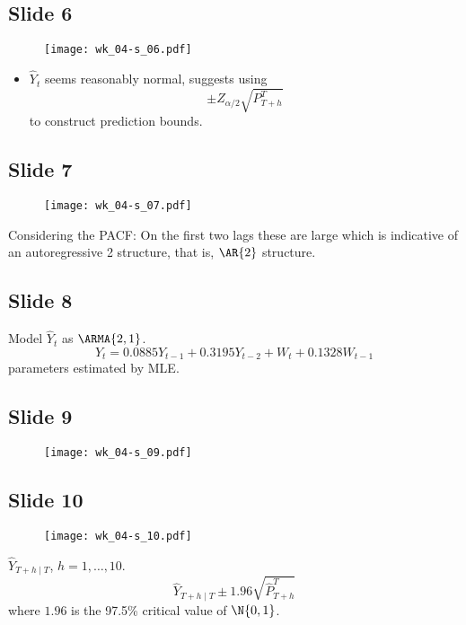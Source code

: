 \subsection*{Slide 6}
\begin{figure}[H]
    \centering
    \texttt{[image: wk\_04-s\_06.pdf]}
\end{figure}
\begin{itemize}
    \item $ \hat{Y}_t $ seems reasonably normal, suggests
          using
          \[ \pm Z_{\alpha/2}\sqrt{P_{T+h}^T} \]
          to construct prediction bounds.
\end{itemize}

\subsection*{Slide 7}
\begin{figure}[H]
    \centering
    \texttt{[image: wk\_04-s\_07.pdf]}
\end{figure}
Considering the PACF\@: On the first two lags these are large which
is indicative of an autoregressive 2 structure, that is, $ \AR{2} $
structure.

\subsection*{Slide 8}
Model $ \hat{Y}_{t} $ as $ \ARMA{2,1} $.
\[ Y_t=0.0885 Y_{t-1}+0.3195 Y_{t-2}+W_t +0.1328 W_{t-1} \]
parameters estimated by MLE\@.

\subsection*{Slide 9}
\begin{figure}[H]
    \centering
    \texttt{[image: wk\_04-s\_09.pdf]}
\end{figure}

\subsection*{Slide 10}
\begin{figure}[H]
    \centering
    \texttt{[image: wk\_04-s\_10.pdf]}
\end{figure}
$ \hat{Y}_{T+h\mid T} $, $ h=1,\ldots,10 $.
\[ \hat{Y}_{T+h\mid T}\pm 1.96\sqrt{\hat{P}_{T+h}^T} \]
where $ 1.96 $ is the 97.5\% critical value of $ \N{0,1} $.

